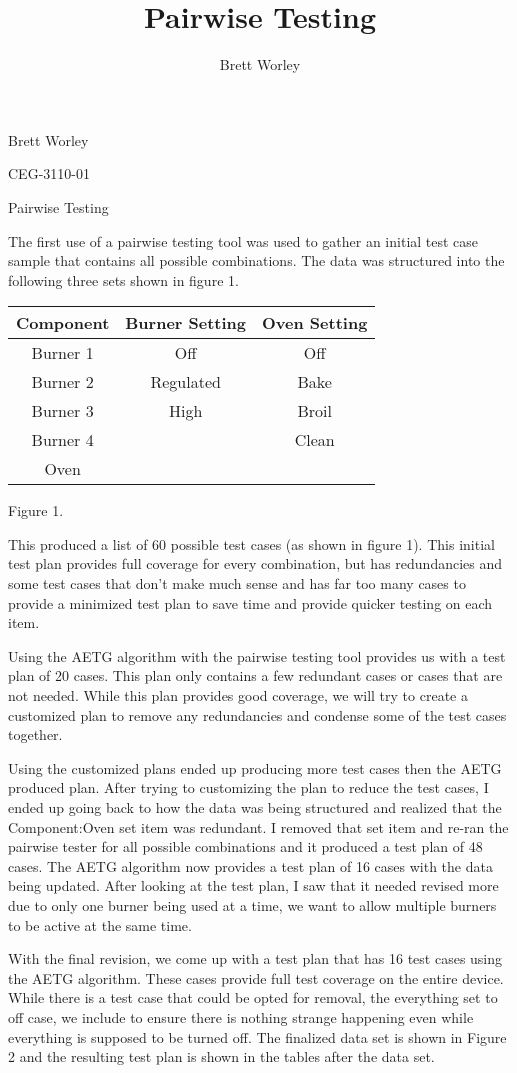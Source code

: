 \documentclass[12pt,letterpaper]{article}
\author{Brett Worley}
\title{Pairwise Testing}
\begin{document}
Brett Worley

CEG-3110-01 

\centerline{Pairwise Testing}

The first use of a pairwise testing tool was used to gather an initial test case sample that contains all possible combinations.  The data was structured into the following three sets shown in figure 1.
\begin{center}
	\begin{tabular}{|| c c c ||}
	\hline
	Component & Burner Setting & Oven Setting \\
	\hline\hline
	Burner 1 & Off & Off \\
	\hline
	Burner 2 & Regulated & Bake \\
	\hline
	Burner 3 & High & Broil \\
	\hline
	Burner 4 & & Clean \\
	\hline
	Oven & & \\
	\hline
	\end{tabular}
	
	Figure 1.
\end{center}
This produced a list of 60 possible test cases (as shown in figure 1).  This initial test plan provides full coverage for every combination, but has redundancies and some test cases that don't make much sense and has far too many cases to provide a minimized test plan to save time and provide quicker testing on each item.

Using the AETG algorithm with the pairwise testing tool provides us with a test plan of 20 cases. This plan only contains a few redundant cases or cases that are not needed.  While this plan provides good coverage, we will try to create a customized plan to remove any redundancies and condense some of the test cases together.

Using the customized plans ended up producing more test cases then the AETG produced plan.  After trying to customizing the plan to reduce the test cases, I ended up going back to how the data was being structured and realized that the Component:Oven set item was redundant.  I removed that set item and re-ran the pairwise tester for all possible combinations and it produced a test plan of 48 cases.  The AETG algorithm now provides a test plan of 16 cases with the data being updated.  After looking at the test plan, I saw that it needed revised more due to only one burner being used at a time, we want to allow multiple burners to be active at the same time.

With the final revision, we come up with a test plan that has 16 test cases using the AETG algorithm.  These cases provide full test coverage on the entire device.  While there is a test case that could be opted for removal, the everything set to off case, we include to ensure there is nothing strange happening even while everything is supposed to be turned off.  The finalized data set is shown in Figure 2 and the resulting test plan is shown in the tables after the data set.
\newline\newline
\end{document}
